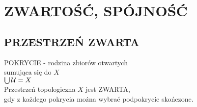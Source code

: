\section{ZWARTOŚĆ, SPÓJNOŚĆ}

\subsection{PRZESTRZEŃ ZWARTA}
\begin{center}\large
    {\color{def}POKRYCIE} - rodzina zbiorów otwartych \\sumująca się do $X$\smallskip\\
    $\bigcup \mathcal{U} = X$\bigskip\\
    Przestrzeń topologiczna $X$ jest {\color{def}ZWARTA}, \\gdy z każdego pokrycia można wybrać podpokrycie skończone.
\end{center}\bigskip

